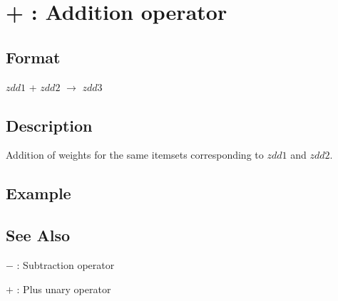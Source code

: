 
\section{+ : Addition operator\label{sect:plus}}
\subsection*{Format}
$zdd1$ + $zdd2$ $\rightarrow$ $zdd3$

\subsection*{Description}
Addition of weights for the same itemsets corresponding to $zdd1$ and $zdd2$. 


\subsection*{Example}


\subsection*{See Also}
\hyperref[sect:minus]{$-$} : Subtraction operator

\hyperref[sect:plus_op]{$+$} : Plus unary operator

